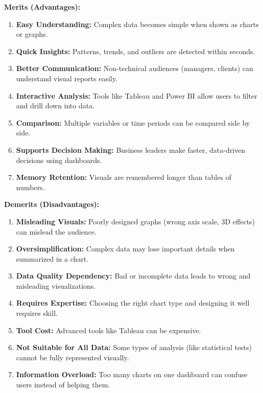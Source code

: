 \documentclass[12pt,a4paper]{article}
\newcommand{\term}[1]{\textbf{\color{headingcolor}#1}}
\begin{document}
\begin{answerenv}

\textbf{\color{headingcolor}Merits (Advantages):}
\begin{enumerate}[leftmargin=1.8em, itemsep=3pt]
  \item \term{Easy Understanding:} Complex data becomes simple when shown as charts or graphs.
  \item \term{Quick Insights:} Patterns, trends, and outliers are detected within seconds.
  \item \term{Better Communication:} Non-technical audiences (managers, clients) can understand visual reports easily.
  \item \term{Interactive Analysis:} Tools like Tableau and Power BI allow users to filter and drill down into data.
  \item \term{Comparison:} Multiple variables or time periods can be compared side by side.
  \item \term{Supports Decision Making:} Business leaders make faster, data-driven decisions using dashboards.
  \item \term{Memory Retention:} Visuals are remembered longer than tables of numbers.
\end{enumerate}

\vspace{6pt}
\textbf{\color{headingcolor}Demerits (Disadvantages):}
\begin{enumerate}[leftmargin=1.8em, itemsep=3pt]
  \item \term{Misleading Visuals:} Poorly designed graphs (wrong axis scale, 3D effects) can mislead the audience.
  \item \term{Oversimplification:} Complex data may lose important details when summarized in a chart.
  \item \term{Data Quality Dependency:} Bad or incomplete data leads to wrong and misleading visualizations.
  \item \term{Requires Expertise:} Choosing the right chart type and designing it well requires skill.
  \item \term{Tool Cost:} Advanced tools like Tableau can be expensive.
  \item \term{Not Suitable for All Data:} Some types of analysis (like statistical tests) cannot be fully represented visually.
  \item \term{Information Overload:} Too many charts on one dashboard can confuse users instead of helping them.
\end{enumerate}

\end{answerenv}
\end{document}
